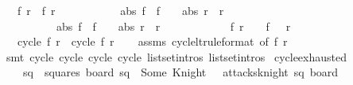 \begin{isabellebody}
\ \ \ {\isachardoublequoteopen}{\isacharparenleft}f{}{\isacharcomma}\ r{}{\isacharparenright}\ {\isasymnoteq}\ {\isacharparenleft}f{}{\isacharcomma}\ r{}{\isacharparenright}{\isachardoublequoteclose}\ \isanewline
\ \ \ \ \ \ \ \ \ \ {\isachardoublequoteopen}abs\ {\isacharparenleft}f{}\ {\isacharminus}\ f{}{\isacharparenright}\ {\isasymnoteq}\ {}\ {\isasymor}\ abs\ {\isacharparenleft}r{}\ {\isacharminus}\ r{}{\isacharparenright}\ {\isasymnoteq}\ {}{\isachardoublequoteclose}\isanewline
\ \ \ \ \ \ \ \ \ \ {\isachardoublequoteopen}abs\ {\isacharparenleft}f{}\ {\isacharminus}\ f{}{\isacharparenright}\ {\isasymnoteq}\ {}\ {\isasymor}\ abs\ {\isacharparenleft}r{}\ {\isacharminus}\ r{}{\isacharparenright}\ {\isasymnoteq}\ {}{\isachardoublequoteclose}\isanewline
\ \ \ \ \ \ \ \ \ \ {\isachardoublequoteopen}{\isacharparenleft}f{}{\isacharcomma}\ r{}{\isacharparenright}\ {\isasymnoteq}\ {\isacharparenleft}{}\ {\isacharminus}\ f{}{\isacharcomma}\ {}\ {\isacharminus}\ r{}{\isacharparenright}{\isachardoublequoteclose}\isanewline
\ \ \ {\isachardoublequoteopen}cycle{}\ {\isacharparenleft}f{}{\isacharcomma}\ r{}{\isacharparenright}\ {\isasymnoteq}\ cycle{}\ {\isacharparenleft}f{}{\isacharcomma}\ r{}{\isacharparenright}{\isachardoublequoteclose}\isanewline
%
\isadelimproof
\ \ %
\endisadelimproof
%
\isatagproof
{}\isamarkupfalse%
\ assms\ cycle{\isacharunderscore}lt{\isacharunderscore}{}{\isacharbrackleft}rule{\isacharunderscore}format{\isacharcomma}\ of\ f{}\ r{}{\isacharbrackright}\isanewline
\ \ \isamarkupfalse%
\ {\isacharparenleft}smt\ cycle{}\ cycle{}\ cycle{}\ cycle{}\ list{\isachardot}set{\isacharunderscore}intros{\isacharparenleft}{}{\isacharparenright}\ list{\isachardot}set{\isacharunderscore}intros{\isacharparenleft}{}{\isacharparenright}{\isacharparenright}%
\endisatagproof
{\isafoldproof}%
%
\isadelimproof
\isanewline
%
\endisadelimproof
\isanewline
{}\isamarkupfalse%
\ cycle{\isacharunderscore}exhausted{\isacharcolon}\isanewline
\ \ \ {\isachardoublequoteopen}{\isasymforall}\ sq\ {\isasymin}\ squares{\isachardot}\ board\ sq\ {\isacharequal}\ Some\ Knight\ {\isasymlongrightarrow}\ {\isasymnot}\ attacks{\isacharunderscore}knight\ sq\ board{\isachardoublequoteclose}\isanewline

\end{isabellebody}
